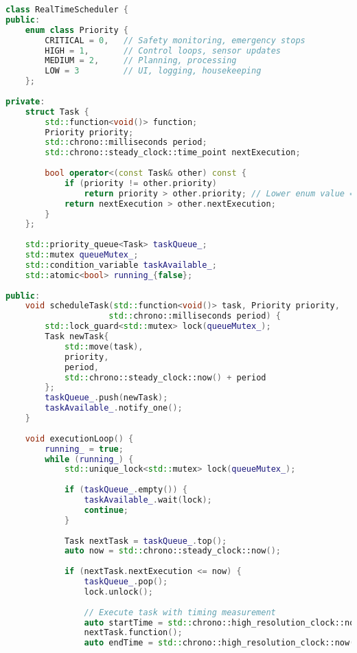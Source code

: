\begin{lstlisting}[language=C++, caption=Real-time Task Scheduler]
class RealTimeScheduler {
public:
    enum class Priority {
        CRITICAL = 0,   // Safety monitoring, emergency stops
        HIGH = 1,       // Control loops, sensor updates
        MEDIUM = 2,     // Planning, processing
        LOW = 3         // UI, logging, housekeeping
    };
    
private:
    struct Task {
        std::function<void()> function;
        Priority priority;
        std::chrono::milliseconds period;
        std::chrono::steady_clock::time_point nextExecution;
        
        bool operator<(const Task& other) const {
            if (priority != other.priority)
                return priority > other.priority; // Lower enum value = higher priority
            return nextExecution > other.nextExecution;
        }
    };
    
    std::priority_queue<Task> taskQueue_;
    std::mutex queueMutex_;
    std::condition_variable taskAvailable_;
    std::atomic<bool> running_{false};
    
public:
    void scheduleTask(std::function<void()> task, Priority priority, 
                     std::chrono::milliseconds period) {
        std::lock_guard<std::mutex> lock(queueMutex_);
        Task newTask{
            std::move(task),
            priority,
            period,
            std::chrono::steady_clock::now() + period
        };
        taskQueue_.push(newTask);
        taskAvailable_.notify_one();
    }
    
    void executionLoop() {
        running_ = true;
        while (running_) {
            std::unique_lock<std::mutex> lock(queueMutex_);
            
            if (taskQueue_.empty()) {
                taskAvailable_.wait(lock);
                continue;
            }
            
            Task nextTask = taskQueue_.top();
            auto now = std::chrono::steady_clock::now();
            
            if (nextTask.nextExecution <= now) {
                taskQueue_.pop();
                lock.unlock();
                
                // Execute task with timing measurement
                auto startTime = std::chrono::high_resolution_clock::now();
                nextTask.function();
                auto endTime = std::chrono::high_resolution_clock::now();
                

\end{lstlisting}
